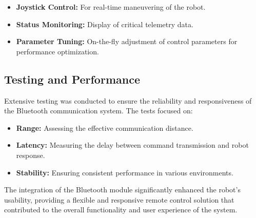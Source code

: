 \begin{itemize}
\item \textbf{Joystick Control:} For real-time maneuvering of the robot.
\item \textbf{Status Monitoring:} Display of critical telemetry data.
\item \textbf{Parameter Tuning:} On-the-fly adjustment of control parameters for performance optimization.
\end{itemize}

\subsection{Testing and Performance}
Extensive testing was conducted to ensure the reliability and responsiveness of the Bluetooth communication system. The tests focused on:

\begin{itemize}
\item \textbf{Range:} Assessing the effective communication distance.
\item \textbf{Latency:} Measuring the delay between command transmission and robot response.
\item \textbf{Stability:} Ensuring consistent performance in various environments.
\end{itemize}

The integration of the Bluetooth module significantly enhanced the robot's usability, providing a flexible and responsive remote control solution that contributed to the overall functionality and user experience of the system.